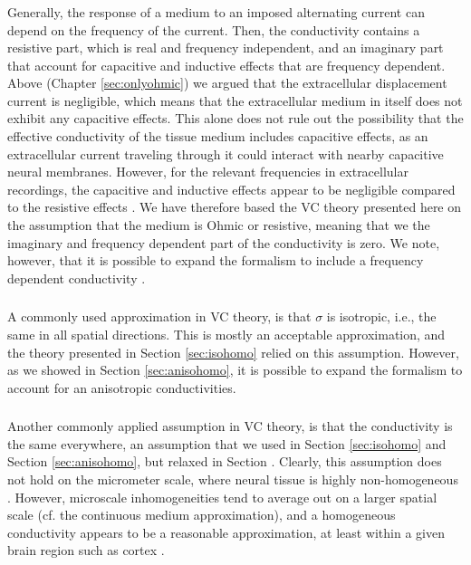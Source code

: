 \subsubsection{ }
\label{sec:f-independent}
Generally, the response of a medium to an imposed alternating current can depend on the frequency of the current. Then, the conductivity contains a resistive part, which is real and frequency independent, and an imaginary part that account for capacitive and inductive effects that are frequency dependent. Above (Chapter \ref{sec:onlyohmic}) we argued that the extracellular displacement current is negligible, which means that the extracellular medium in itself does not exhibit any capacitive effects. This alone does not rule out the possibility that the effective conductivity of the tissue medium includes capacitive effects, as an extracellular current traveling through it could interact with nearby capacitive neural membranes. However, for the relevant frequencies in extracellular recordings, the capacitive and inductive effects appear to be negligible compared to the resistive effects \cite{Logothetis2007, Miceli2017, Ranta2017}. We have therefore based the VC theory presented here on the assumption that the medium is Ohmic or resistive, meaning that we the imaginary and frequency dependent part of the conductivity is zero. We note, however, that it is possible to expand the formalism to include a frequency dependent conductivity \cite{Bedard2004, Tracey2011, Miceli2017}. 


\subsubsection{ }
A commonly used approximation in VC theory, is that $\sigma$ is isotropic, i.e., the same in all spatial directions. This is mostly an acceptable approximation, and the theory presented in Section \ref{sec:isohomo} relied on this assumption. However, as we showed in Section \ref{sec:anisohomo}, it is possible to expand the formalism to account for an anisotropic conductivities.


\subsubsection{ }
Another commonly applied assumption in VC theory, is that the conductivity is the same everywhere, an assumption that we used in Section \ref{sec:isohomo} and Section \ref{sec:anisohomo}, but relaxed in Section \label{sec:nonhomo}. Clearly, this assumption does not hold on the micrometer scale, where neural tissue is highly non-homogeneous \citep{Nicholson1998}. However, microscale inhomogeneities tend to average out on a larger spatial scale (cf. the continuous medium approximation), and a homogeneous conductivity appears to be a reasonable approximation, at least within a given brain region such as cortex \citep{Logothetis2007}. 

